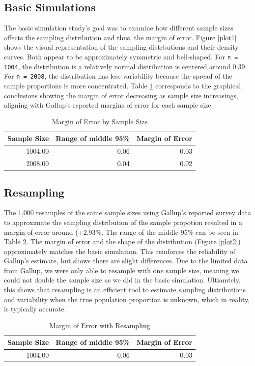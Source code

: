 \documentclass{article}\usepackage[]{graphicx}\usepackage[]{xcolor}
\begin{document}
\begin{multicols}{2}
\subsection{Basic Simulations}
The basic simulation study's goal was to examine how different sample sizes affects the sampling distribution and thus, the margin of error. Figure \ref{plot1} shows the visual representation of the sampling distrbutions and their density curves. Both appear to be approximately symmetric and bell-shaped. For \texttt{n = 1004}, the distribution is a relatively normal distribution is centered around 0.39. For \texttt{n = 2008}, the distribution has less variability because the spread of the sample proportions is more concentrated. Table \ref{Table 1} corresponds to the graphical conclusions showing the margin of error decreasing as sample size increasings, aligning with Gallup's reported margins of error for each sample size. 
\begin{table}[H]
\centering
\begingroup\small
\begin{tabular}{rrr}
  \hline
Sample Size & Range of middle 95\% & Margin of Error \\ 
  \hline
1004.00 & 0.06 & 0.03 \\ 
  2008.00 & 0.04 & 0.02 \\ 
   \hline
\end{tabular}
\endgroup
\caption{Margin of Error by Sample Size} 
\label{Table 1}
\end{table}


\subsection{Resampling}
The 1,000 resamples of the same sample sizes using Gallup's reported survey data to approximate the sampling distribution of the sample propotion resulted in a margin of error around (\(\pm 2.93\% \). The range of the middle 95\% can be seen in Table \ref{Table 2}. The margin of error and the shape of the distribution (Figure \ref{plot2}) approximately matches the basic simulation. This reinforces the reliability of Gallup's estimate, but shows there are slight differences. Due to the limited data from Gallup, we were only able to resample with one sample size, meaning we could not double the sample size as we did in the basic simulation. Ultiamtely, this shows that resampling is an efficient tool to estimate sampling distributions and variability when the true population proportion is unknown, which in reality, is typically accurate.
\begin{table}[H]
\centering
\begingroup\small
\begin{tabular}{rrr}
  \hline
Sample Size & Range of middle 95\% & Margin of Error \\ 
  \hline
1004.00 & 0.06 & 0.03 \\ 
   \hline
\end{tabular}
\endgroup
\caption{Margin of Error with Resampling} 
\label{Table 2}
\end{table}



\end{multicols}
\end{document}
